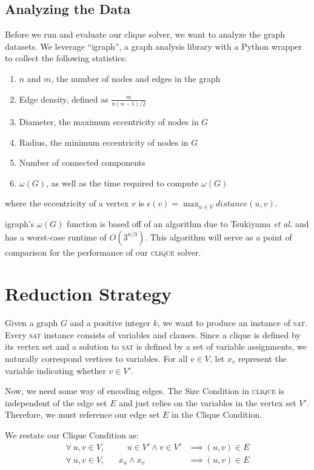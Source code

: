 \documentclass[]{article}
\newcommand{\clique}{\textsc{clique}}
\newcommand{\sat}{\textsc{sat}}
\begin{document}
	\subsection{Analyzing the Data}
	Before we run and evaluate our clique solver, we want to analyze the graph datasets. We leverage ``igraph'', a graph analysis library with a Python wrapper to collect the following statistics:
	\begin{enumerate}
		\item $n$ and $m$, the number of nodes and edges in the graph
		\item Edge density, defined as $\frac{m}{n (n - 1) / 2}$
		\item Diameter, the maximum eccentricity of nodes in $G$
		\item Radius, the minimum eccentricity of nodes in $G$
		\item Number of connected components
		\item $\omega(G)$, as well as the time required to compute $\omega(G)$
	\end{enumerate}
	where the eccentricity of a vertex $v$ is $\epsilon(v) = \max_{u \in V} distance(u, v)$.
	
	igraph's $\omega(G)$ function is based off of an algorithm due to Tsukiyama \textit{et al.} and has a worst-case runtime of $O\left(3^{n/3}\right)$. This algorithm will serve as a point of comparison for the performance of our \clique{} solver.
	
	\section{Reduction Strategy}
	Given a graph $G$ and a positive integer $k$, we want to produce an instance of \sat{}. Every \sat{} instance consists of variables and clauses. Since a clique is defined by its vertex set and a solution to \sat{} is defined by a set of variable assignments, we naturally correspond vertices to variables. For all $v \in V$, let $x_v$ represent the variable indicating whether $v \in V'$.
	 
	Now, we need some way of encoding edges. The Size Condition in \clique{} is independent of the edge set $E$ and just relies on the variables in the vertex set $V'$. Therefore, we must reference our edge set $E$ in the Clique Condition.
	
	We restate our Clique Condition as:
	\begin{align}
	\forall~u,v \in V,&& \quad u \in V' \land v \in V' &\implies (u, v) \in E \\
	\forall~u,v \in V,&& x_u \land x_v &\implies (u, v) \in E
	\end{align}
	
\end{document}
